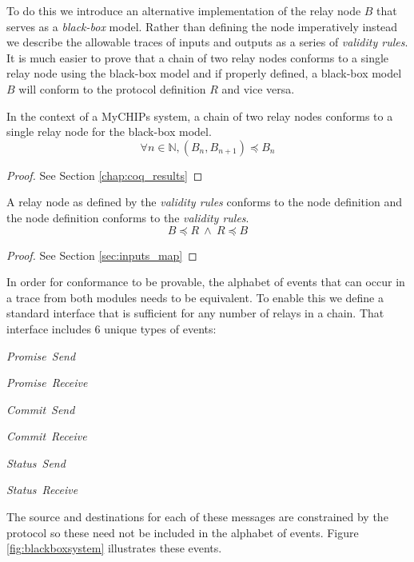 \documentclass[runningheads]{llncs}
\newcommand{\send}{\emph{Send}}
\newcommand{\receive}{\emph{Receive}}
\newcommand{\promise}{\emph{Promise}}
\newcommand{\commit}{\emph{Commit}}
\newcommand{\status}{\emph{Status}}
\newcommand{\figref}[1]{Figure \ref{#1}}
\newcommand{\secref}[1]{Section \ref{#1}}
\newif\ifcomments
\newif\ifkylecomments
\newcommand{\egm}[1]{\ifcomments\textcolor{orange}{egm: #1}\fi}
\newcommand{\krs}[1]{\ifkylecomments\textcolor{blue}{krs: #1}\fi}
\begin{document}
\krs{Good call. Changed to \emph{Ref} and $\Delta$ \egm{A brief word on notation. Earlier, $B$ is used for balance, and $R$ is used for referee. Not super ideal because now $R$ is the white-box version of the relay and $B$ in the black-box version of the relay. Maybe find something different for the balance and referee earlier?}}
To do this we introduce an alternative implementation of the relay node $B$ that serves as a \emph{black-box} model. Rather than defining the node imperatively instead we describe the allowable traces of inputs and outputs as a series of \emph{validity rules}. 
It is much easier to prove that a chain of two relay nodes conforms to a single relay node using the black-box model and if properly defined, a black-box model $B$ will conform to the protocol definition $R$ and vice versa.

\begin{lemma}
\label{lemma:chain_conform}
In the context of a MyCHIPs system, a chain of two relay nodes conforms to a single relay node for the black-box model.
$$\forall n \in \mathds{N}, (B_n, B_{n+1}) \preceq B_n
$$
\begin{proof}
    See \secref{chap:coq_results}
\end{proof}
\end{lemma}

\begin{lemma}
\label{lemma:ind_cof_model}
A relay node as defined by the \emph{validity rules} conforms to the node definition and the node definition conforms to the \emph{validity rules}.
$$B \preceq R\ 
\wedge\ 
R \preceq B$$
\begin{proof}
    See \secref{sec:inputs_map}
\end{proof}
\end{lemma}


In order for conformance to be provable, the alphabet of events that can occur in a trace from both modules needs to be equivalent. To enable this we define a standard interface that is sufficient for any number of relays in a chain. That interface includes 6 unique types of events:
\begin{compactenum}
    \item \promise\ \send\
    \item \promise\ \receive\
    \item \commit\ \send\
    \item \commit\ \receive\
    \item \status\ \send\
    \item \status\ \receive\
\end{compactenum}
\noindent The source and destinations for each of these messages are constrained by the protocol so these need not be included in the alphabet of events. \figref{fig:blackboxsystem} illustrates these events.
\end{document}
